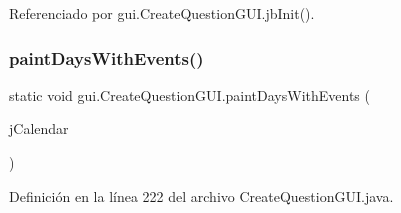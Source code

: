 Referenciado por gui.\+Create\+Question\+G\+U\+I.\+jb\+Init().

\mbox{\label{classgui_1_1CreateQuestionGUI_a31ee6b80a30b5fb2fae4347a754f9246}} 
\subsubsection{\texorpdfstring{paintDaysWithEvents()}{paintDaysWithEvents()}}
{\footnotesize\ttfamily static void gui.\+Create\+Question\+G\+U\+I.\+paint\+Days\+With\+Events (\begin{DoxyParamCaption}\item[{J\+Calendar}]{j\+Calendar }\end{DoxyParamCaption})\hspace{0.3cm}{\ttfamily [static]}}



Definición en la línea 222 del archivo Create\+Question\+G\+U\+I.\+java.


